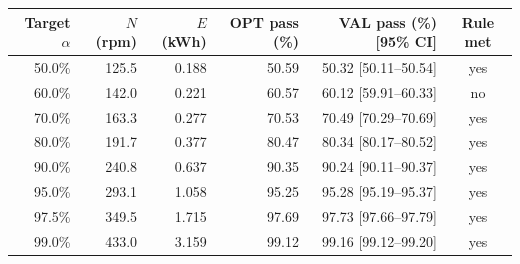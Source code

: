 \begin{tabular}{rrrrrc}
\toprule
Target $\alpha$ & $N$ (rpm) & $E$ (kWh) & OPT pass (\%) & VAL pass (\%) [95\% CI] & Rule met \\
\midrule
50.0\% & 125.5 & 0.188 & 50.59 & 50.32 [50.11--50.54] & yes \\
60.0\% & 142.0 & 0.221 & 60.57 & 60.12 [59.91--60.33] & no \\
70.0\% & 163.3 & 0.277 & 70.53 & 70.49 [70.29--70.69] & yes \\
80.0\% & 191.7 & 0.377 & 80.47 & 80.34 [80.17--80.52] & yes \\
90.0\% & 240.8 & 0.637 & 90.35 & 90.24 [90.11--90.37] & yes \\
95.0\% & 293.1 & 1.058 & 95.25 & 95.28 [95.19--95.37] & yes \\
97.5\% & 349.5 & 1.715 & 97.69 & 97.73 [97.66--97.79] & yes \\
99.0\% & 433.0 & 3.159 & 99.12 & 99.16 [99.12--99.20] & yes \\
\bottomrule
\end{tabular}
